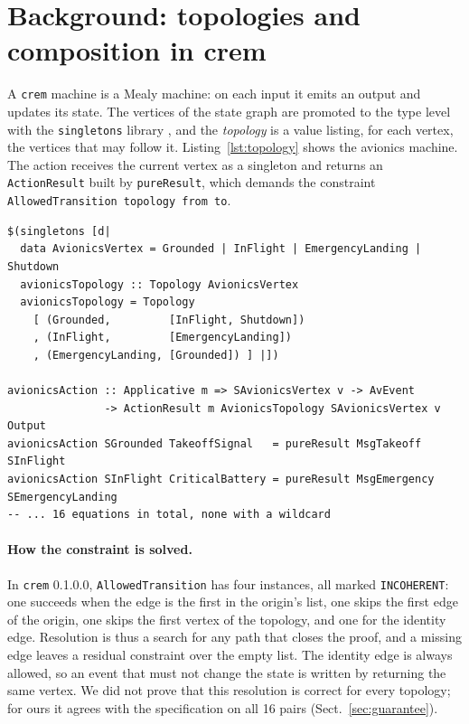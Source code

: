 \documentclass[review]{jfp-epi}
\newcommand{\crem}{\texttt{crem}}
\newcommand{\code}[1]{\texttt{#1}}
\begin{document}
\section{Background: topologies and composition in crem}
\label{sec:background}

A \crem{} machine is a Mealy machine: on each input it emits an output and updates its state. The vertices of the state graph are promoted to the type level with the \code{singletons} library \cite{eisenberg2012singletons}, and the \emph{topology} is a value listing, for each vertex, the vertices that may follow it. Listing~\ref{lst:topology} shows the avionics machine. The action receives the current vertex as a singleton and returns an \code{ActionResult} built by \code{pureResult}, which demands the constraint \code{AllowedTransition topology from to}.

\begin{lstlisting}[float=t,caption={Topology and action of the avionics machine (excerpt).},label={lst:topology}]
$(singletons [d|
  data AvionicsVertex = Grounded | InFlight | EmergencyLanding | Shutdown
  avionicsTopology :: Topology AvionicsVertex
  avionicsTopology = Topology
    [ (Grounded,         [InFlight, Shutdown])
    , (InFlight,         [EmergencyLanding])
    , (EmergencyLanding, [Grounded]) ] |])

avionicsAction :: Applicative m => SAvionicsVertex v -> AvEvent
               -> ActionResult m AvionicsTopology SAvionicsVertex v Output
avionicsAction SGrounded TakeoffSignal   = pureResult MsgTakeoff   SInFlight
avionicsAction SInFlight CriticalBattery = pureResult MsgEmergency SEmergencyLanding
-- ... 16 equations in total, none with a wildcard
\end{lstlisting}

\paragraph{How the constraint is solved.} In \code{crem} 0.1.0.0, \code{AllowedTransition} has four instances, all marked \code{INCOHERENT}: one succeeds when the edge is the first in the origin's list, one skips the first edge of the origin, one skips the first vertex of the topology, and one for the identity edge. Resolution is thus a search for any path that closes the proof, and a missing edge leaves a residual constraint over the empty list. The identity edge is always allowed, so an event that must not change the state is written by returning the same vertex. We did not prove that this resolution is correct for every topology; for ours it agrees with the specification on all 16 pairs (Sect.~\ref{sec:guarantee}).
\end{document}
